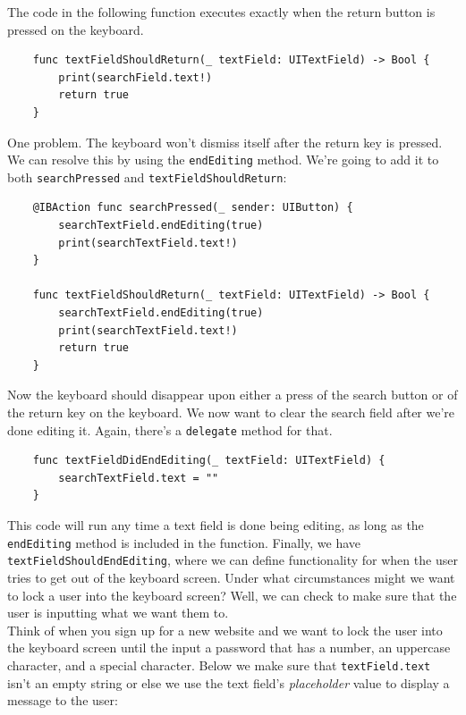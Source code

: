 \documentclass[12pt, letterpaper]{article}
\begin{document}
The code in the following function executes exactly when the return button is pressed on the keyboard.

\begin{verbatim}
    func textFieldShouldReturn(_ textField: UITextField) -> Bool {
        print(searchField.text!)
        return true
    }
\end{verbatim}

One problem. The keyboard won't dismiss itself after the return key is pressed. We can resolve this by using the 
\verb+endEditing+ method. We're going to add it to both \verb+searchPressed+ and \verb+textFieldShouldReturn+:

\begin{verbatim}
    @IBAction func searchPressed(_ sender: UIButton) {
        searchTextField.endEditing(true)
        print(searchTextField.text!)
    }

    func textFieldShouldReturn(_ textField: UITextField) -> Bool {
        searchTextField.endEditing(true)
        print(searchTextField.text!)
        return true
    }
\end{verbatim}

Now the keyboard should disappear upon either a press of the search button or of the return key on the keyboard. We
now want to clear the search field after we're done editing it. Again, there's a \verb+delegate+ method for that. \\

\begin{verbatim}
    func textFieldDidEndEditing(_ textField: UITextField) {
        searchTextField.text = ""
    }
\end{verbatim}

This code will run any time a text field is done being editing, as long as the \verb+endEditing+ method is included in the
function. Finally, we have \verb+textFieldShouldEndEditing+, where we can define functionality for when the user tries
to get out of the keyboard screen. Under what circumstances might we want to lock a user into the keyboard screen?
Well, we can check to make sure that the user is inputting what we want them to. \\

Think of when you sign up for a new website and we want to lock the user into the keyboard screen until the input a 
password that has a number, an uppercase character, and a special character. Below we make sure that 
\verb+textField.text+ isn't an empty string or else we use the text field's \emph{placeholder} value 
to display a message to the user:
\end{document}
